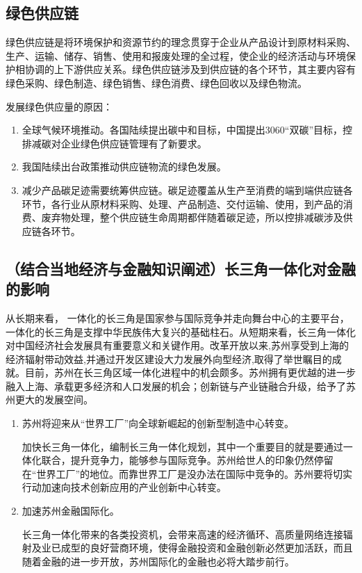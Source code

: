 \documentclass{article}
\begin{document}
\subsection{绿色供应链}

绿色供应链是将环境保护和资源节约的理念贯穿于企业从产品设计到原材料采购、生产、运输、储存、销售、使用和报废处理的全过程，使企业的经济活动与环境保护相协调的上下游供应关系。绿色供应链涉及到供应链的各个环节，其主要内容有绿色采购、绿色制造、绿色销售、绿色消费、绿色回收以及绿色物流。

发展绿色供应量的原因：
\begin{enumerate}
	\item 全球气候环境推动。各国陆续提出碳中和目标，中国提出3060“双碳”目标，控排减碳对企业绿色供应链管理有了新要求。
	\item 我国陆续出台政策推动供应链物流的绿色发展。
	\item 减少产品碳足迹需要统筹供应链。碳足迹覆盖从生产至消费的端到端供应链各环节，各行业从原材料采购、处理、产品制造、交付运输、使用，到产品的消费、废弃物处理，整个供应链生命周期都伴随着碳足迹，所以控排减碳涉及供应链各环节。
\end{enumerate}

\subsection{（结合当地经济与金融知识阐述）长三角一体化对金融的影响}

从长期来看， 一体化的长三角是国家参与国际竞争并走向舞台中心的主要平台，一体化的长三角是支撑中华民族伟大复兴的基础柱石。从短期来看，长三角一体化对中国经济社会发展具有重要意义和关键作用。改革开放以来,苏州享受到上海的经济辐射带动效益,并通过开发区建设大力发展外向型经济,取得了举世瞩目的成就。目前，苏州在长三角区域一体化进程中的机会颇多。苏州拥有更优越的进一步融入上海、承载更多经济和人口发展的机会；创新链与产业链融合升级，给予了苏州更大的发展空间。
\begin{enumerate}
	\item 苏州将迎来从“世界工厂”向全球新崛起的创新型制造中心转变。
  
	加快长三角一体化，编制长三角一体化规划，其中一个重要目的就是要通过一体化联合，提升竞争力，能够参与国际竞争。苏州给世人的印象仍然停留在“世界工厂”的地位。而靠世界工厂是没办法在国际中竞争的。苏州要将切实行动加速向技术创新应用的产业创新中心转变。
	
	\item 加速苏州金融国际化。
  
	长三角一体化带来的各类投资机，会带来高速的经济循环、高质量网络连接辐射及业已成型的良好营商环境，使得金融投资和金融创新必然更加活跃，而且随着金融的进一步开放，苏州国际化的金融也必将大踏步前行。
\end{enumerate}
\end{document}
